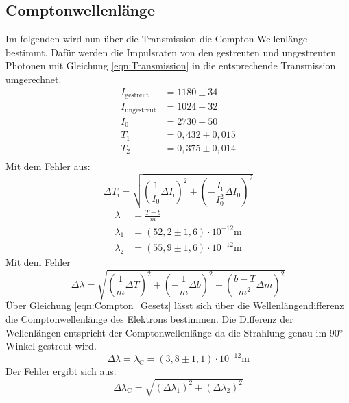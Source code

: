 \subsection{Comptonwellenlänge}
Im folgenden wird nun über die Transmission die Compton-Wellenlänge bestimmt.
Dafür werden die Impulsraten von den gestreuten und ungestreuten Photonen mit Gleichung \ref{eqn:Transmission} in die entsprechende Transmission umgerechnet.
\begin{align*}
    I_{\text{gestreut}} &= 1180 \pm 34  \\ 
    I_{\text{ungestreut}} &= 1024 \pm 32  \\
    I_0 &= 2730 \pm 50 \\
    T_1 &= 0,432 \pm 0,015 \\
    T_2 &= 0,375 \pm 0,014 \\ 
\end{align*}
Mit dem Fehler aus:
\begin{equation*}
    \Delta T_{\text{i}} = \sqrt{\left( \frac{1}{I_0} \Delta I_{\text{i}} \right)^2 + \left( -\frac{I_{\text{i}}}{I_0^2}\Delta I_0 \right)^2}
\end{equation*}
\begin{align*}
    \lambda &= \frac{T-b}{m} \\
    \lambda_{1} &=  (52,2 \pm 1,6) \cdot 10^{-12} \text{m}\\
    \lambda_{2} &=  (55,9 \pm 1,6) \cdot 10^{-12} \text{m}
\end{align*}
Mit dem Fehler
\begin{equation*}
    \Delta\lambda = \sqrt{ \left( \frac{1}{m}  \Delta T \right)^2 + \left( -\frac{1}{m} \Delta b \right)^2 +\left( \frac{b-T}{m^2} \Delta m \right)^2} 
\end{equation*}
Über Gleichung \ref{eqn:Compton_Gesetz} lässt sich über die Wellenlängendifferenz die Comptonwellenlänge des Elektrons bestimmen.
Die Differenz der Wellenlängen entspricht der Comptonwellenlänge da die Strahlung genau im 90° Winkel gestreut wird.
\begin{equation*}
    \Delta\lambda = \lambda_{\text{C}} = (3,8\pm 1,1)\cdot 10^{-12} \text{m}
\end{equation*}
Der Fehler ergibt sich aus:
\begin{equation*}
    \Delta \lambda_{\text{C}} = \sqrt{\left(\Delta\lambda_1\right)^2 + \left(\Delta \lambda_2\right)^2}
\end{equation*}

